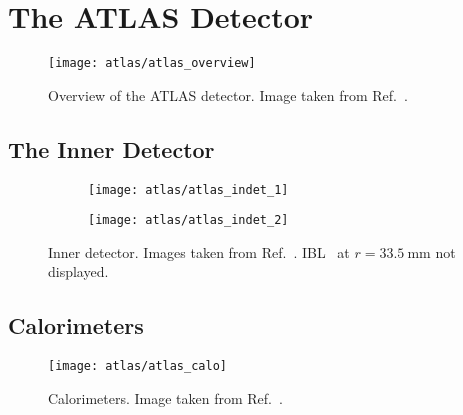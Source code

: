 \section{The ATLAS Detector}

\cite{PERF-2007-01}

\begin{figure}[htbp]
  \centering

  \texttt{[image: atlas/atlas\_overview]}

  \caption{Overview of the ATLAS detector. Image taken from
    Ref.~\cite{Pequenao:1095924}.}%
  \label{fig:atlas_detector_overview}
\end{figure}



\subsection{The Inner Detector}

\begin{figure}[htbp]

  \begin{subfigure}[b]{0.55\textwidth}
    \texttt{[image: atlas/atlas\_indet\_1]}%
    \subcaption{}
  \end{subfigure}\hfill%
  \begin{subfigure}[b]{0.45\textwidth}
    \texttt{[image: atlas/atlas\_indet\_2]}%
    \subcaption{}

  \end{subfigure}

  \caption{Inner detector. Images taken from
    Ref.~\cite{Pequenao:1095926}. IBL~\cite{PIX-2018-001} at
    $r = \SI{33.5}{\milli\metre}$ not displayed.}
  \label{fig:atlas_inner_detector}
\end{figure}


\subsection{Calorimeters}

\begin{figure}[htbp]
  \centering

  \texttt{[image: atlas/atlas\_calo]}

  \caption{Calorimeters. Image taken from Ref.~\cite{Pequenao:1095927}.}%
  \label{fig:atlas_calorimeters}
\end{figure}


